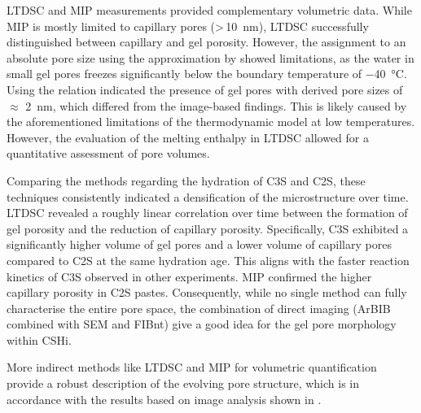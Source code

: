 \ac{LTDSC} and \ac{MIP} measurements provided complementary volumetric data.
While \ac{MIP} is mostly limited to capillary pores (>\,\qty{10}{\nano\meter}), \ac{LTDSC} successfully distinguished between capillary and gel porosity.
However, the assignment to an absolute pore size using the approximation by \textcite{brun.1977} showed limitations, as the water in small gel pores freezes significantly below the boundary temperature of \qty{-40}{\degreeCelsius}.
Using the \textcite{brun.1977} relation indicated the presence of gel pores with derived pore sizes of $\approx$ \qty{2}{\nano\meter}, which differed from the image-based findings.
This is likely caused by the aforementioned limitations of the thermodynamic model at low temperatures.
However, the evaluation of the melting enthalpy in \ac{LTDSC} allowed for a quantitative assessment of pore volumes.

Comparing the methods regarding the hydration of \ac{C3S} and \ac{C2S}, these techniques consistently indicated a densification of the microstructure over time.
\ac{LTDSC} revealed a roughly linear correlation over time between the formation of gel porosity and the reduction of capillary porosity.
Specifically, \ac{C3S} exhibited a significantly higher volume of gel pores and a lower volume of capillary pores compared to \ac{C2S} at the same hydration age.
This aligns with the faster reaction kinetics of \ac{C3S} observed in other experiments.
\ac{MIP} confirmed the higher capillary porosity in \ac{C2S} pastes.
Consequently, while no single method can fully characterise the entire pore space, the combination of direct imaging (\ac{ArBIB} combined with \ac{SEM} and \ac{FIBnt}) give a good idea for the gel pore morphology within \ac*{CSHi}.

More indirect methods like \ac{LTDSC} and \ac{MIP} for volumetric quantification provide a robust description of the evolving pore structure, which is in accordance with the results based on image analysis shown in .
